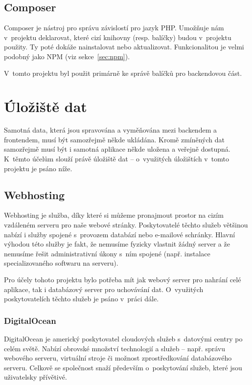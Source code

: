 	\subsection{Composer}\label{sec:composer}
	Composer je nástroj pro správu závislostí pro jazyk PHP. Umožňuje nám v~projektu deklarovat, které cizí knihovny (resp. balíčky) budou v~projektu použity. Ty poté dokáže nainstalovat nebo aktualizovat. Funkcionalitou je velmi podobný jako NPM (viz sekce~\ref{sec:npm}). \cite{Composer}
	
	V~tomto projektu byl použit primárně ke správě balíčků pro backendovou část.
		
\section{Úložiště dat}
Samotná data, která jsou spravována a vyměňována mezi backendem a frontendem, musí být samozřejmě někde ukládána. Kromě zmíněných dat samozřejmě musí být i samotná aplikace někde uložena a veřejně dostupná. K~těmto účelům slouží právě úložiště dat – o~využitých úložištích v~tomto projektu je psáno níže.

	\subsection{Webhosting}
	Webhosting je služba, díky které si můžeme pronajmout prostor na cizím vzdáleném serveru pro naše webové stránky. Poskytovatelé těchto služeb většinou nabízí i služby spojené s~provozem databází nebo e-mailové schránky. Hlavní výhodou této služby je fakt, že nemusíme fyzicky vlastnit žádný server a že nemusíme řešit administrativní úkony s~ním spojené (např. instalace specializovaného softwaru na serveru). \cite{Webhosting}
	
	Pro účely tohoto projektu bylo potřeba mít jak webový server pro nahrání celé aplikace, tak i databázový server pro uchovávání dat. O~využitých poskytovatelích těchto služeb je psáno v~práci dále. 
	
		\subsubsection{DigitalOcean}\label{sec:do}
		DigitalOcean je americký poskytovatel cloudových služeb s~datovými centry po celém světě. Nabízí obrovské množství technologií a služeb – např. správu webového serveru, virtuální stroje či možnost zprostředkování databázového serveru. Celkově se společnost snaží především o~poskytování služeb, které jsou uživatelsky přívětivé. \cite{DO1}\cite{DO2}
		

